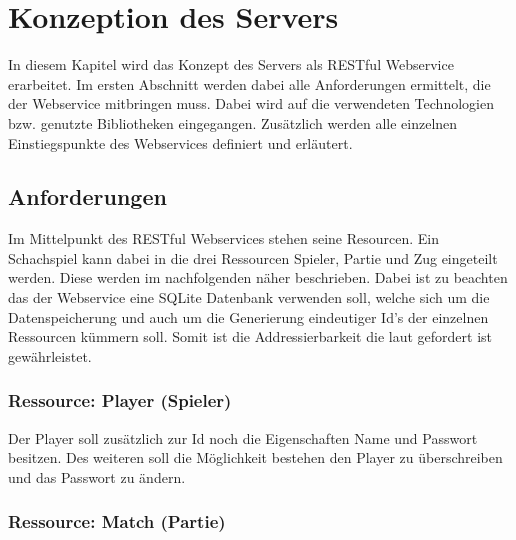 
\chapter{Konzeption des Servers}
In diesem Kapitel wird das Konzept des Servers als RESTful Webservice erarbeitet. Im ersten Abschnitt werden dabei alle Anforderungen ermittelt, die der Webservice mitbringen muss.
Dabei wird auf die verwendeten Technologien bzw. genutzte Bibliotheken eingegangen. Zusätzlich werden alle einzelnen Einstiegspunkte des Webservices definiert und erläutert. 

\section{Anforderungen}
Im Mittelpunkt des RESTful Webservices stehen seine Resourcen. Ein Schachspiel kann dabei in die drei Ressourcen Spieler, Partie und Zug eingeteilt werden. Diese werden im nachfolgenden näher beschrieben. Dabei ist zu beachten das der Webservice eine SQLite Datenbank verwenden soll, welche sich um die Datenspeicherung und auch um die Generierung eindeutiger Id's der einzelnen Ressourcen kümmern soll. Somit ist die Addressierbarkeit die laut \cite[7]{kretzschmar}  gefordert ist gewährleistet.

\subsection{Ressource: Player (Spieler)}
Der Player soll zusätzlich zur Id noch die Eigenschaften Name und Passwort besitzen. Des weiteren soll die Möglichkeit bestehen den Player zu überschreiben und das Passwort zu ändern.
\begin{figure} [H]
\centering
{}	
\end{figure}

\subsection{Ressource: Match (Partie)}

